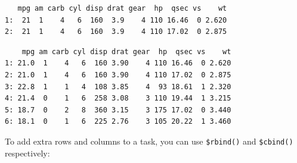 \begin{verbatim}
   mpg am carb cyl disp drat gear  hp  qsec vs    wt
1:  21  1    4   6  160  3.9    4 110 16.46  0 2.620
2:  21  1    4   6  160  3.9    4 110 17.02  0 2.875
\end{verbatim}

\begin{Shaded}
\begin{Highlighting}[]
\OtherTok{=} \NormalTok{(}\NormalTok{)}
\OtherTok{=}\SpecialCharTok{$}\NormalTok{()}
\SpecialCharTok{$}\NormalTok{(}\SpecialCharTok{:}\NormalTok{)}
\SpecialCharTok{$}\NormalTok{()}
\end{Highlighting}
\end{Shaded}

\begin{verbatim}
    mpg am carb cyl disp drat gear  hp  qsec vs    wt
1: 21.0  1    4   6  160 3.90    4 110 16.46  0 2.620
2: 21.0  1    4   6  160 3.90    4 110 17.02  0 2.875
3: 22.8  1    1   4  108 3.85    4  93 18.61  1 2.320
4: 21.4  0    1   6  258 3.08    3 110 19.44  1 3.215
5: 18.7  0    2   8  360 3.15    3 175 17.02  0 3.440
6: 18.1  0    1   6  225 2.76    3 105 20.22  1 3.460
\end{verbatim}

To add extra rows and columns to a task, you can use \texttt{\$rbind()}
and \texttt{\$cbind()} respectively:

\begin{Shaded}
\begin{Highlighting}[]
\SpecialCharTok{$}\NormalTok{( }
  \NormalTok{(} \NormalTok{(}\NormalTok{, }\NormalTok{))}
\NormalTok{)}
\SpecialCharTok{$}\NormalTok{( }
  \NormalTok{(} \NormalTok{, } \NormalTok{, } \NormalTok{)}
\NormalTok{)}
\SpecialCharTok{$}\NormalTok{()}
\end{Highlighting}
\end{Shaded}

